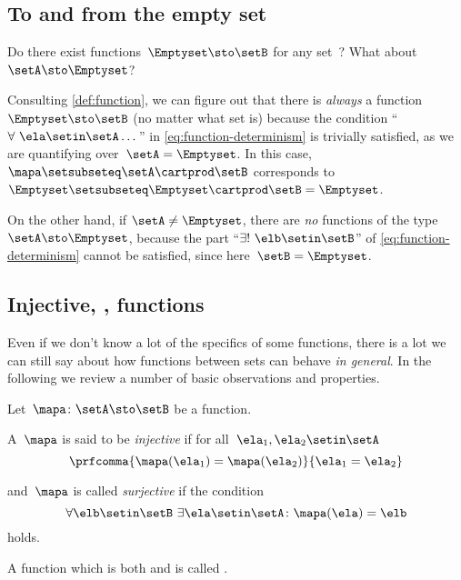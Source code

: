 \subsection{To and from the empty set}

Do there exist functions~$\Emptyset \sto \setB$ for any set~\setB?
What about~$\setA \sto \Emptyset$?

Consulting \cref{def:function}, we can figure out that there is \emph{always} a function $\Emptyset \sto \setB$ (no matter what set \setB is) because the condition ``$\forall \ \ela \setin\setA \dots$'' in \cref{eq:function-determinism} is trivially satisfied, as we are quantifying over~$\setA = \Emptyset$.
In this case,~$\mapa \setsubseteq \setA \cartprod \setB$ corresponds to~$\Emptyset \setsubseteq \Emptyset \cartprod \setB = \Emptyset$.

On the other hand, if $\setA \neq \Emptyset$, there are \emph{no} functions of the type~$\setA \sto \Emptyset$, because the part ``$\exists ! \ \elb \setin\setB$'' of \cref{eq:function-determinism} cannot be satisfied, since here~$\setB = \Emptyset$.

\subsection{Injective, ,  functions}
\label{sub:injective-and-surjective}

Even if we don't know a lot of the specifics of some functions, there is a lot we can still say about how functions between sets can behave \emph{in general}.
In the following we review a number of basic observations and properties.

Let~$\mapa\colon \setA \sto \setB$ be a function.
\begin{ctdefinition}\label{def:injective-function}
    A~$\mapa$ is said to be \emph{injective} if for all~$\ela_1, \ela_2 \setin\setA$
    \begin{equation}
        \label{eq:injectivity-cond}
        \prfcomma{
            \mapa(\ela_1) = \mapa(\ela_2)
        }{
            \ela_1 = \ela_2
        }
    \end{equation}
\end{ctdefinition}
\begin{ctdefinition}\label{def:surjective-function}
    and~$\mapa$ is called \emph{surjective} if the condition
    \begin{equation}
        \label{eq:surjectivity-cond}
        \forall \elb \setin\setB \ \exists \ela \setin\setA \colon \mapa(\ela) = \elb
    \end{equation}
    holds.
\end{ctdefinition}
\begin{ctdefinition}\label{def:bijective-function}
    A function which is both  and  is called .
\end{ctdefinition}

